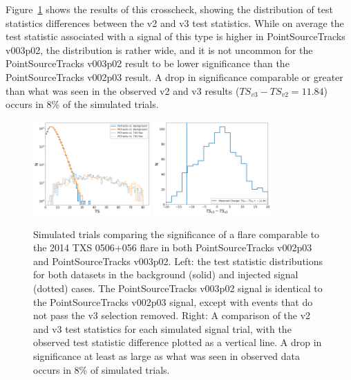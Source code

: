 Figure~\ref{fig:v2v3diff} shows the results of this crosscheck, showing the distribution of test statistics differences between the v2 and v3 test statistics. While on average the test statistic associated with a signal of this type is higher in PointSourceTracks v003p02, the distribution is rather wide, and it is not uncommon for the PointSourceTracks v003p02 result to be lower significance than the PointSourceTracks v002p03 result. A drop in significance comparable or greater than what was seen in the observed v2 and v3 results ($TS_{v3}-TS_{v2}=11.84$) occurs in 8\% of the simulated trials. 


\begin{figure}[h]
\centering
\includegraphics[width=0.4\textwidth]{figs/v2v3tsdists.png}
\includegraphics[width=0.4\textwidth]{figs/v2v3tsdiff.png}
\caption{Simulated trials comparing the significance of a flare comparable to the 2014 TXS 0506+056 flare in both PointSourceTracks v002p03 and PointSourceTracks v003p02. Left: the test statistic distributions for both datasets in the background (solid) and injected signal (dotted) cases. The PointSourceTracks v003p02 signal is identical to the PointSourceTracks v002p03 signal, except with events that do not pass the v3 selection removed. Right: A comparison of the v2 and v3 test statistics for each simulated signal trial, with the observed test statistic difference plotted as a vertical line. A drop in significance at least as large as what was seen in observed data occurs in 8\% of simulated trials.}
\label{fig:v2v3diff}
\end{figure}

